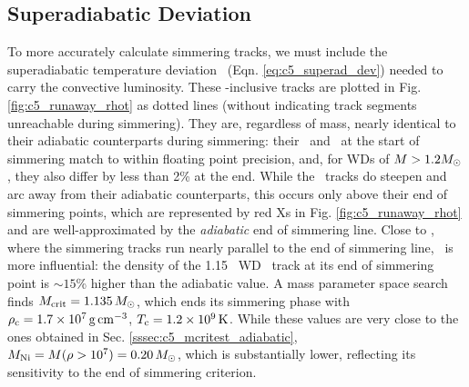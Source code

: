
\subsection{Superadiabatic Deviation \dnabconv}
\label{ssec:c5_runaway_superad}

To more accurately calculate simmering tracks, we must include the superadiabatic temperature deviation \dnabconv\ (Eqn. \ref{eq:c5_superad_dev}) needed to carry the convective luminosity.  These \dnabconv-inclusive tracks are plotted in Fig. \ref{fig:c5_runaway_rhot} as dotted lines (without indicating track segments unreachable during simmering).  They are, regardless of mass, nearly identical to their adiabatic counterparts during simmering: their \rhoc\ and \Tc\ at the start of simmering match to within floating point precision, and, for WDs of $M > 1.2\Msun$, they also differ by less than 2\% at the end.  While the \dnabconv\ tracks do steepen and arc away from their adiabatic counterparts, this occurs only above their end of simmering points, which are represented by red Xs in Fig. \ref{fig:c5_runaway_rhot} and are well-approximated by the \textit{adiabatic} end of simmering line.  Close to \Mcrit, where the simmering tracks run nearly parallel to the end of simmering line, \dnabconv\ is more influential: the density of the 1.15 \Msun\ WD \dnabconv\ track at its end of simmering point is $\sim15$\% higher than the adiabatic value.  A mass parameter space search finds $\Mcrit=1.135\,\Msun$, which ends its simmering phase with $\rhoc = 1.7\times10^7\,\gcc$, $\Tc = 1.2\times10^9\,\mrm{K}$.  While these values are very close to the ones obtained in Sec. \ref{sssec:c5_mcritest_adiabatic}, $\MNi = M(\rho>10^7) = 0.20\,\Msun$, which is substantially lower, reflecting its sensitivity to the end of simmering criterion.


